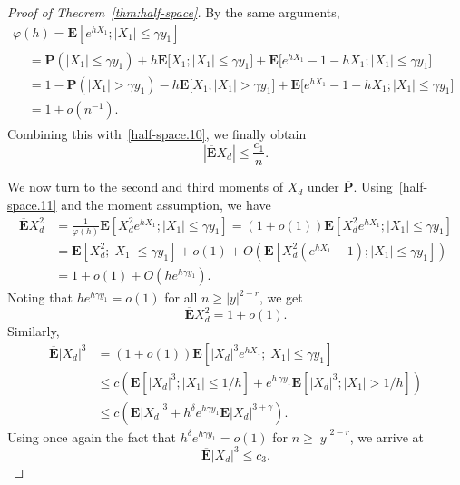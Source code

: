 \documentclass[10pt]{amsart}
\theoremstyle{definition}\newtheorem{defi}[theo]{Definition}\newtheorem{rema}[theo]{Remark}\newtheorem{exam}[theo]{Example}\newtheorem{exem}[theo]{Example}\newtheorem{nota}[theo]{Notation}
\newcommand{\pr}{\mathbf{P}}
\newcommand{\e}{\mathbf{E}}
\renewcommand{\le}{\leqslant}
\renewcommand{\ge}{\geqslant}
\begin{document}
\begin{proof}[Proof of Theorem~\ref{thm:half-space}]
By the same arguments,
\begin{multline}\label{half-space.11}
\varphi(h)=\e\left[e^{hX_1};|X_1|\le\gamma y_1\right]\\
\begin{aligned}
&=\pr\left(|X_1|\le \gamma y_1\right)+h\e\big[X_1;|X_1|\le\gamma y_1\big] +\e\big[e^{hX_1}-1-hX_1;|X_1|\le\gamma y_1\big]\\
&=1-\pr\left(|X_1|> \gamma y_1\right)-h\e\big[X_1;|X_1|>\gamma y_1\big] +\e\big[e^{hX_1}-1-hX_1;|X_1|\le\gamma y_1\big]\\
&=1+o\left(n^{-1}\right).
\end{aligned}
\end{multline}
Combining this with~\eqref{half-space.10}, we finally obtain
\begin{equation}\label{half-space.12}
\left|\overline{\e}X_d\right|\le\frac{c_1}{n}.
\end{equation}

We now turn to the second and third moments of $X_d$ under $\overline{\pr}$. Using~\eqref{half-space.11} and the moment assumption, we have
\begin{align*}
\overline{\e}X_d^2&=\frac{1}{\varphi(h)}\e\left[X_d^2e^{hX_1};|X_1|\le\gamma y_1\right] =\left(1+o(1)\right)\e\left[X_d^2e^{hX_1};|X_1|\le\gamma y_1\right]\\
&=\e\left[X_d^2;|X_1|\le\gamma y_1\right]+o(1)+O\left(\e\left[X_d^2\left(e^{hX_1}-1\right);|X_1|\le\gamma y_1\right]\right)\\
&=1+o(1)+O\left(he^{h\gamma y_1}\right).
\end{align*}
Noting that $he^{h\gamma y_1}=o(1)$ for all $n\ge|y|^{2-r}$, we get
\begin{equation}\label{half-space.13}
\overline{\e}X_d^2=1+o(1).
\end{equation}
Similarly,
\begin{align*}
\overline{\e}|X_d|^3&=(1+o(1))\e\left[|X_d|^3e^{hX_1};|X_1|\le\gamma y_1\right]\\
&\le c\left(\e\left[|X_d|^3;|X_1|\le 1/h\right]+e^{h\,\gamma y_1}\e\left[\left|X_d\right|^3;| X_1|>1/h\right]\right)\\
&\le c\left(\e|X_d|^3+h^\delta e^{h\gamma y_1}\e| X_d|^{3+\gamma}\right).
\end{align*}
Using once again the fact that $h^\delta e^{h\gamma y_1}=o(1)$ for $n\ge| y|^{2-r}$, we arrive at
\begin{equation}\label{half-space.14}
\overline{\e}|X_d|^3\le c_3.
\end{equation}


\end{proof}
\end{document}
